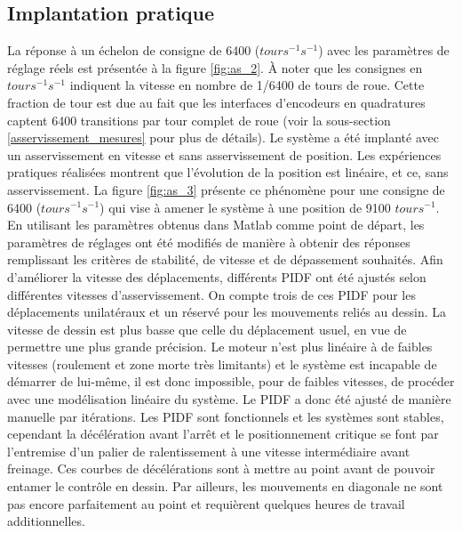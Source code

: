 \subsection{Implantation pratique}
\label{s:ass_implantation_pratique}
La réponse à un échelon de consigne de 6400 ($tours^{-1} s^{-1}$) avec les paramètres de réglage réels est présentée à la figure \ref{fig:as_2}. À noter que les consignes en $tours^{-1} s^{-1}$ indiquent la vitesse en nombre de 1/6400 de tours de roue. Cette fraction de tour est due au fait que les interfaces d'encodeurs en quadratures captent 6400 transitions par tour complet de roue (voir la sous-section \ref{asservissement_mesures} pour plus de détails).
Le système a été implanté avec un asservissement en vitesse et sans asservissement de position. Les expériences pratiques réalisées montrent que l'évolution de la position est linéaire, et ce, sans asservissement. La figure \ref{fig:as_3} présente ce phénomène pour une consigne de 6400 ($tours^{-1} s^{-1}$) qui vise à amener le système à une position de 9100 $tours^{-1}$.
En utilisant les paramètres obtenus dans Matlab comme point de départ, les paramètres de réglages ont été modifiés de manière à obtenir des réponses remplissant les critères de stabilité, de vitesse et de dépassement souhaités. Afin d'améliorer la vitesse des déplacements, différents PIDF ont été ajustés selon différentes vitesses d'asservissement. On compte trois de ces PIDF pour les déplacements unilatéraux et un réservé pour les mouvements reliés au dessin. La vitesse de dessin est plus basse que celle du déplacement usuel, en vue de permettre une plus grande précision. Le moteur n'est plus linéaire à de faibles vitesses (roulement et zone morte très limitants) et le système est incapable de démarrer de lui-même, il est donc impossible, pour de faibles vitesses, de procéder avec une modélisation linéaire du système. Le PIDF a donc été ajusté de manière manuelle par itérations. Les PIDF sont fonctionnels et les systèmes sont stables, cependant la décélération avant l'arrêt et le positionnement critique se font par l'entremise d'un palier de ralentissement à une vitesse intermédiaire avant freinage. Ces courbes de décélérations sont à mettre au point avant de pouvoir entamer le contrôle en dessin. Par ailleurs, les mouvements en diagonale ne sont pas encore parfaitement au point et requièrent quelques heures de travail additionnelles.
